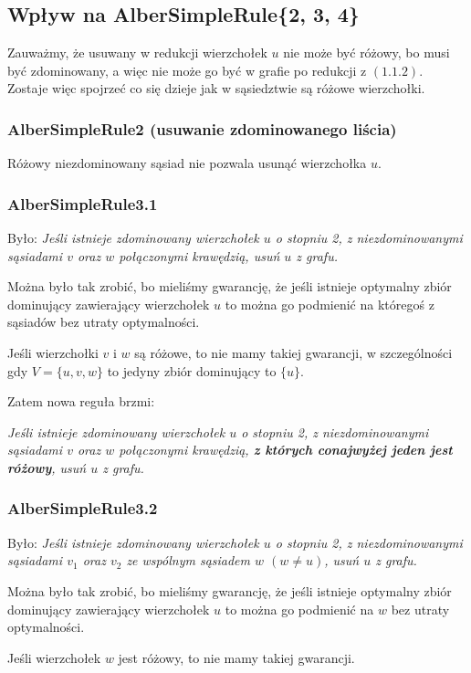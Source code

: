 \documentclass[12pt]{article}
\begin{document}
\subsection{Wpływ na AlberSimpleRule\{2, 3, 4\}}
Zauważmy, że usuwany w redukcji wierzchołek $u$ nie może być różowy, bo musi być zdominowany, a więc nie może go być w grafie po redukcji z $(1.1.2)$.
Zostaje więc spojrzeć co się dzieje jak w sąsiedztwie są różowe wierzchołki.

\subsubsection{AlberSimpleRule2 (usuwanie zdominowanego liścia)}
Różowy niezdominowany sąsiad nie pozwala usunąć wierzchołka $u$.

\subsubsection{AlberSimpleRule3.1}
Było: \emph{Jeśli istnieje zdominowany wierzchołek $u$ o stopniu 2, z niezdominowanymi sąsiadami $v$ oraz $w$ połączonymi krawędzią, usuń $u$ z grafu. }

Można było tak zrobić, bo mieliśmy gwarancję, że jeśli istnieje optymalny zbiór dominujący zawierający wierzchołek $u$ to można go podmienić na któregoś z sąsiadów bez utraty optymalności. 

Jeśli wierzchołki $v$ i $w$ są różowe, to nie mamy takiej gwarancji, w szczególności gdy $V = \{u, v, w\}$ to jedyny zbiór dominujący to $\{u\}$.

Zatem nowa reguła brzmi:

\emph{Jeśli istnieje zdominowany wierzchołek $u$ o stopniu 2, z niezdominowanymi sąsiadami $v$ oraz $w$ połączonymi krawędzią, 
\textbf{z których conajwyżej jeden jest różowy}, usuń $u$ z grafu. }

\subsubsection{AlberSimpleRule3.2}
Było: \emph{Jeśli istnieje zdominowany wierzchołek $u$ o stopniu 2, z niezdominowanymi sąsiadami $v_1$ oraz $v_2$ ze wspólnym sąsiadem $w$ $(w \neq u)$, usuń $u$ z grafu. }

Można było tak zrobić, bo mieliśmy gwarancję, że jeśli istnieje optymalny zbiór dominujący zawierający wierzchołek $u$ to można go podmienić na $w$ bez utraty optymalności. 

Jeśli wierzchołek $w$ jest różowy, to nie mamy takiej gwarancji.
\end{document}
